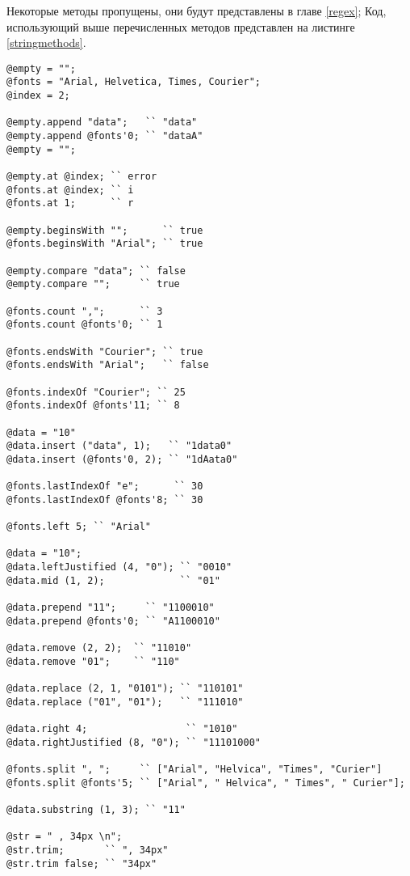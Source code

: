 Некоторые методы пропущены, они будут представлены в главе \ref{regex}; Код, использующий выше перечисленных методов представлен на листинге \ref{stringmethods}.

\begin{sourcecode}
\label{stringmethods}
\begin{verbatim}
@empty = "";
@fonts = "Arial, Helvetica, Times, Courier";
@index = 2;

@empty.append "data";   `` "data"
@empty.append @fonts'0; `` "dataA"
@empty = "";

@empty.at @index; `` error
@fonts.at @index; `` i
@fonts.at 1;	  `` r

@empty.beginsWith "";      `` true
@fonts.beginsWith "Arial"; `` true

@empty.compare "data"; `` false
@empty.compare "";     `` true

@fonts.count ",";      `` 3
@fonts.count @fonts'0; `` 1

@fonts.endsWith "Courier"; `` true
@fonts.endsWith "Arial";   `` false

@fonts.indexOf "Courier"; `` 25
@fonts.indexOf @fonts'11; `` 8

@data = "10"
@data.insert ("data", 1);   `` "1data0"
@data.insert (@fonts'0, 2); `` "1dAata0"

@fonts.lastIndexOf "e";      `` 30
@fonts.lastIndexOf @fonts'8; `` 30

@fonts.left 5; `` "Arial"

@data = "10";
@data.leftJustified (4, "0"); `` "0010"
@data.mid (1, 2);             `` "01"

@data.prepend "11";     `` "1100010"
@data.prepend @fonts'0; `` "A1100010"

@data.remove (2, 2);  `` "11010"
@data.remove "01";    `` "110"

@data.replace (2, 1, "0101"); `` "110101"
@data.replace ("01", "01");   `` "111010"

@data.right 4; 				   `` "1010"
@data.rightJustified (8, "0"); `` "11101000"

@fonts.split ", ";     `` ["Arial", "Helvica", "Times", "Curier"]
@fonts.split @fonts'5; `` ["Arial", " Helvica", " Times", " Curier"];

@data.substring (1, 3); `` "11"

@str = " , 34px \n";
@str.trim;       `` ", 34px"
@str.trim false; `` "34px"
\end{verbatim}
\end{sourcecode}

